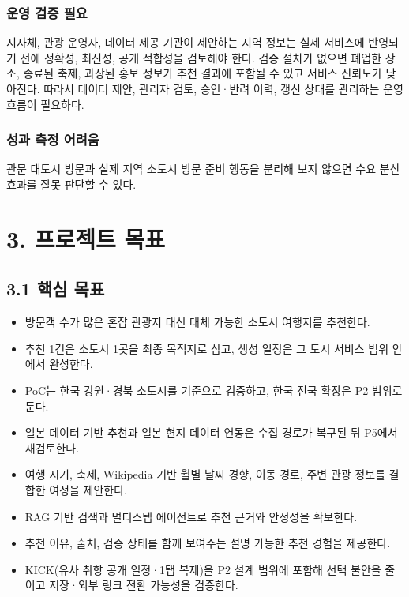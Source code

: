 \documentclass[12pt,a4paper]{article}
\newcommand{\DocNeedspace}[1]{\par\ifdim\dimexpr\pagegoal-\pagetotal\relax<#1\newpage\fi}
\begin{document}
\DocNeedspace{5\baselineskip}
\subsubsection*{운영 검증 필요}
지자체, 관광 운영자, 데이터 제공 기관이 제안하는 지역 정보는 실제 서비스에 반영되기 전에 정확성, 최신성, 공개 적합성을 검토해야 한다. 검증 절차가 없으면 폐업한 장소, 종료된 축제, 과장된 홍보 정보가 추천 결과에 포함될 수 있고 서비스 신뢰도가 낮아진다. 따라서 데이터 제안, 관리자 검토, 승인·반려 이력, 갱신 상태를 관리하는 운영 흐름이 필요하다.

\DocNeedspace{5\baselineskip}
\subsubsection*{성과 측정 어려움}
관문 대도시 방문과 실제 지역 소도시 방문 준비 행동을 분리해 보지 않으면 수요 분산 효과를 잘못 판단할 수 있다.


\newpage

\DocNeedspace{10\baselineskip}
\section*{3. 프로젝트 목표}


\DocNeedspace{8\baselineskip}
\subsection*{3.1 핵심 목표}


\begin{itemize}
\item 방문객 수가 많은 혼잡 관광지 대신 대체 가능한 소도시 여행지를 추천한다.
\item 추천 1건은 소도시 1곳을 최종 목적지로 삼고, 생성 일정은 그 도시 서비스 범위 안에서 완성한다.
\item PoC는 한국 강원·경북 소도시를 기준으로 검증하고, 한국 전국 확장은 P2 범위로 둔다.
\item 일본 데이터 기반 추천과 일본 현지 데이터 연동은 수집 경로가 복구된 뒤 P5에서 재검토한다.
\item 여행 시기, 축제, Wikipedia 기반 월별 날씨 경향, 이동 경로, 주변 관광 정보를 결합한 여정을 제안한다.
\item RAG 기반 검색과 멀티스텝 에이전트로 추천 근거와 안정성을 확보한다.
\item 추천 이유, 출처, 검증 상태를 함께 보여주는 설명 가능한 추천 경험을 제공한다.
\item KICK(유사 취향 공개 일정·1탭 복제)을 P2 설계 범위에 포함해 선택 불안을 줄이고 저장·외부 링크 전환 가능성을 검증한다.
\end{itemize}
\end{document}
